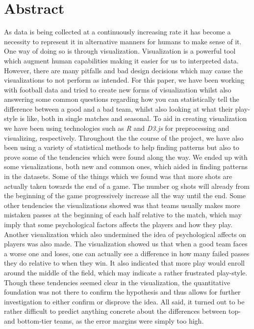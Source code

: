 \documentclass[11pt]{article}
\begin{document}
 

\section*{Abstract}

As data is being collected at a continuously increasing rate it has become a necessity to represent it in alternative manners for humans to make sense of it. One way of doing so is through visualization. Visualization is a powerful tool which augment human capabilities making it easier for us to interpreted data. However, there are many pitfalls and bad design decisions which may cause the visualizations to not perform as intended. For this paper, we have been working with football data and tried to create new forms of visualization whilst also answering some common questions regarding how you can statistically tell the difference between a good and a bad team, whilst also looking at what their play-style is like, both in single matches and seasonal. To aid in creating visualization we have been using technologies such as \textit{R} and \textit{D3.js} for preprocessing and visualizing, respectively. Throughout the the course of the project, we have also been using a variety of statistical methods to help finding patterns but also to prove some of the tendencies which were found along the way. We ended up with some visualizations, both new and common ones, which aided in finding patterns in the datasets. Some of the things which we found was that more shots are actually taken towards the end of a game. The number og shots will already from the beginning of the game progressively increase all the way until the end. Some other tendencies the visualizations showed was that teams usually makes more mistaken passes at the beginning of each half relative to the match, which may imply that some psychological factors affects the players and how they play. Another visualization which also undermined the idea of psychological affects on players was also made. The visualization showed us that when a good team faces a worse one and loses, one can actually see a difference in how many failed passes they do relative to when they win. It also indicated that more play would enroll around the middle of the field, which may indicate a rather frustrated play-style. Though these tendencies seemed clear in the visualization, the quantitative foundation was not there to confirm the hypothesis and thus allows for further investigation to either confirm or disprove the idea. All said, it turned out to be rather difficult to predict anything concrete about the differences between top- and bottom-tier teams, as the error margins were simply too high.
\end{document}
